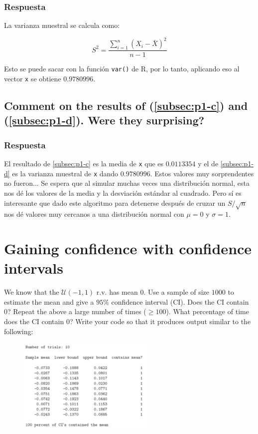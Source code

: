 \documentclass[12pt]{article}\usepackage[]{graphicx}\usepackage[]{xcolor}
\begin{document}
\subsubsection{Respuesta}

La varianza muestral se calcula como:

\[
S^{2} = \frac{\sum_{i=1}^{n} (X_{i} - \bar{X})^{2}}{n-1}
\]

Esto se puede sacar con la función \lstinline|var()| de \textsf{R}, por lo tanto, aplicando eso al vector \lstinline|x| se obtiene $0.9780996$.



\subsection{Comment on the results of (\ref{subsec:p1-c}) and (\ref{subsec:p1-d}). Were they surprising?}
\label{subsec:p1-e}

\subsubsection{Respuesta}

El resultado de \ref{subsec:p1-c} es la media de \lstinline|x| que es $0.0113354$ y el de \ref{subsec:p1-d} es la varianza muestral de \lstinline|x| dando $0.9780996$. Estos valores muy sorprendentes no fueron... Se espera que al simular muchas veces una distribución normal, esta nos dé los valores de la media y la desviación estándar al cuadrado. Pero sí es interesante que dado este algoritmo para detenerse después de cruzar un $S / \sqrt{n}$ nos dé valores muy cercanos a una distribución normal con $\mu = 0$ y $\sigma = 1$.


\newpage

\section{Gaining confidence with confidence intervals}

We know that the $\mathcal{U}(-1, 1)$ r.v. has mean 0. Use a sample of size $1000$ to estimate the mean and give a $95\%$ confidence interval (CI). Does the CI contain 0? Repeat the above a large number of times ($\geq  100$). What percentage of time does the CI contain 0? Write your code so that it produces output similar to the following:

\begin{figure}[ht]
  \centering
  \includegraphics[width=0.6\textwidth]{img/Punto2.png}
\end{figure}
\end{document}
